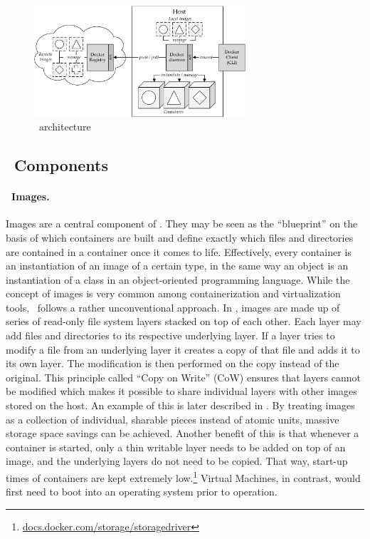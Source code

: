 \begin{figure}[htpb]
  \centering
  \includegraphics[width=0.7\textwidth]{figures/docker-arch.pdf}
  \caption[\docker\ architecture]{\docker\ architecture}\label{fig:docker-arch}
\end{figure}

\pagebreak
\subsection{\docker\ Components}
\paragraph{\docker\ Images.}
Images are a central component of \docker . They may be seen as the ``blueprint'' on the basis of which containers are built and define exactly which files and directories are contained in a container once it comes to life. Effectively, every container is an instantiation of an image of a certain type, in the same way an object is an instantiation of a class in an object-oriented programming language. While the concept of images is very common among containerization and virtualization tools, \docker\ follows a rather unconventional approach.
In \docker , images are made up of series of read-only file system layers stacked on top of each other. Each layer may add files and directories to its respective underlying layer. If a layer tries to modify a file from an underlying layer it creates a copy of that file and adds it to its own layer. The modification is then performed on the copy instead of the original. This principle called ``Copy on Write'' (CoW) ensures that layers cannot be modified which makes it possible to share individual layers with other images stored on the host. An example of this is later described in . By treating images as a collection of individual, sharable pieces instead of atomic units, massive storage space savings can be achieved. Another benefit of this is that whenever a container is started, only a thin writable layer needs to be added on top of an image, and the underlying layers do not need to be copied. That way, start-up times of containers are kept extremely low.\footnote{\url{docs.docker.com/storage/storagedriver}} Virtual Machines, in contrast, would first need to boot into an operating system prior to operation.

